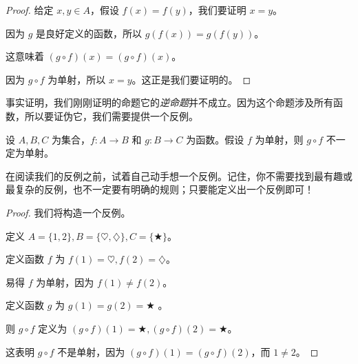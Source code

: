\begin{proof}
    给定 $x,y \in A$，假设 $f(x)=f(y)$，我们要证明 $x=y$。

    因为 $g$ 是良好定义的函数，所以 $g(f(x)) = g(f(y))$。

    这意味着 $(g \circ f)(x) = (g \circ f)(x)$。

    因为 $g \circ f$ 为单射，所以 $x=y$。这正是我们要证明的。
\end{proof}

事实证明，我们刚刚证明的命题它的\emph{逆命题}并不成立。因为这个命题涉及所有函数，所以要证伪它，我们需要提供一个反例。

\begin{proposition}
    设 $A, B, C$ 为集合，$f : A \to B$ 和 $g : B \to C$ 为函数。假设 $f$ 为单射，则 $g \circ f$ 不一定为单射。
\end{proposition}

在阅读我们的反例之前，试着自己动手想一个反例。记住，你不需要找到最有趣或最复杂的反例，也不一定要有明确的规则；只要能定义出一个反例即可！

\begin{proof}
    我们将构造一个反例。

    定义 $A = \{1, 2\}, B = \{\heartsuit, \diamondsuit\}, C = \{\bigstar\}$。

    定义函数 $f$ 为 $f(1) = \heartsuit, f(2) = \diamondsuit$。

    易得 $f$ 为单射，因为 $f(1) \ne f(2)$。

    定义函数 $g$ 为 $g(1) = g(2) = \bigstar$ 。

    则 $g \circ f$ 定义为 $(g \circ f)(1) = \bigstar, (g \circ f)(2) = \bigstar$。

    这表明 $g \circ f$ 不是单射，因为 $(g \circ f)(1) = (g \circ f)(2)$，而 $1 \ne 2$。
\end{proof}
